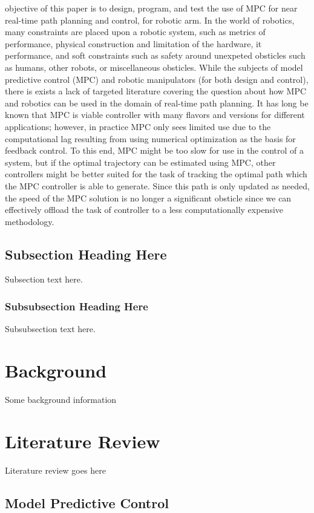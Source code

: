 \documentclass[journal]{IEEEtran}
\begin{document}
 objective of this paper is to design, program, and test the use of MPC for near real-time path planning and control, for robotic arm. In the world of robotics, many constraints are placed upon a robotic system, such as metrics of performance, physical construction and limitation of the hardware, it performance, and soft constraints such as safety around unexpeted obsticles such as humans, other robots, or miscellaneous obsticles. While the subjects of model predictive control (MPC) and robotic manipulators (for both design and control), there is exists a lack of targeted literature covering the question about how MPC and robotics can be used in the domain of real-time path planning. It has long be known that MPC is viable controller with many flavors and versions for different applications; however, in practice MPC only sees limited use due to the computational lag resulting from using numerical optimization as the basis for feedback control. To this end, MPC might be too slow for use in the control of a system, but if the optimal trajectory can be estimated using MPC, other controllers might be better suited for the task of tracking the optimal path which the MPC controller is able to generate. Since this path is only updated as needed, the speed of the MPC solution is no longer a significant obsticle since we can effectively offload the task of controller to a less computationally expensive methodology.


\subsection{Subsection Heading Here}
Subsection text here.

\subsubsection{Subsubsection Heading Here}
Subsubsection text here.


\section{Background}

Some background information
\section{Literature Review}
Literature review goes here

\subsection{Model Predictive Control}
\end{document}
